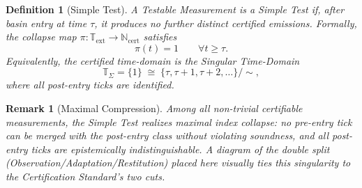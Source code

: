 \documentclass[12pt]{article}
\newtheorem{definition}{Definition}[section]
\newtheorem{remark}{Remark}[section]
\begin{document}
\begin{definition}[Simple Test]
\label{def:simple-test}
A Testable Measurement is a \emph{Simple Test} if, after basin entry at time $\tau$, it produces no further distinct certified emissions.  Formally, the collapse map $\pi:\mathbb T_{\mathrm{ext}}\to\mathbb N_{\mathrm{cert}}$ satisfies
\[
  \pi(t)=1\qquad\forall t\ge\tau.
\]
Equivalently, the certified time-domain is the \emph{Singular Time-Domain}
\[
  \mathbb T_\Sigma=\{1\}
  \;\cong\;
  \{\tau,\tau+1,\tau+2,\dots\}/\sim,
\]
where all post-entry ticks are identified.
\end{definition}

\begin{remark}[Maximal Compression]
Among all non-trivial certifiable measurements, the Simple Test realizes \emph{maximal index collapse}: no pre-entry tick can be merged with the post-entry class without violating soundness, and all post-entry ticks are epistemically indistinguishable.  A diagram of the \emph{double split} (Observation/Adaptation/Restitution) placed here visually ties this singularity to the Certification Standard’s two cuts.
\end{remark}
\end{document}
